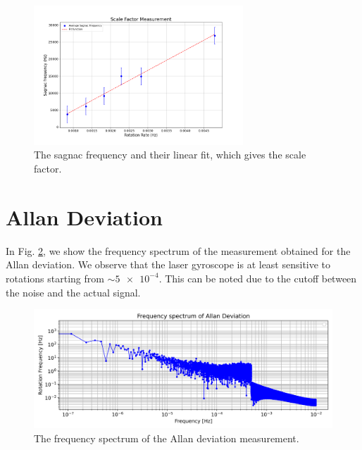\documentclass[a4paper]{report}
\numberwithin{equation}{section}
\begin{document}
\begin{figure}[htpb]
	\centering
	\includegraphics[width=0.7\textwidth]{scale-factor}
	\caption{The sagnac frequency and their linear fit, which gives the scale factor.}
	\label{fig:scale-factor}
\end{figure}


\section{Allan Deviation}

In Fig. \ref{fig:allan_fs}, we show the frequency spectrum of the measurement obtained for the Allan deviation. We observe that the laser gyroscope is 
at least sensitive to rotations starting from $\sim \num{5e-4}$. This can be noted due to the cutoff between the noise and the 
actual signal. 

\begin{figure}[h!]
	\centering
	\includegraphics[width=0.8\columnwidth]{allan_fs.png}
	\caption{The frequency spectrum of the Allan deviation measurement.}
	\label{fig:allan_fs}
\end{figure}
\end{document}
